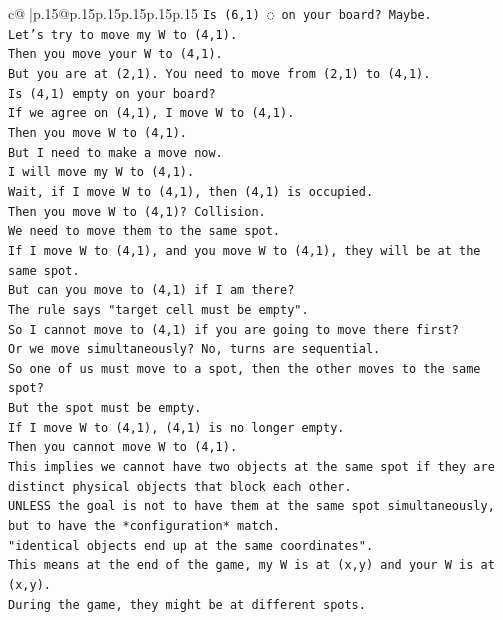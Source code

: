 \documentclass{article}
\begin{document}
{\begin{supertabular}{c@{$\;$}|p{.15\linewidth}@{}p{.15\linewidth}p{.15\linewidth}p{.15\linewidth}p{.15\linewidth}p{.15\linewidth}}
{{{\texttt{Is (6,1) ◌ on your board? Maybe.} \\
\texttt{Let's try to move my W to (4,1).} \\
\texttt{Then you move your W to (4,1).} \\
\texttt{But you are at (2,1). You need to move from (2,1) to (4,1).} \\
\texttt{Is (4,1) empty on your board?} \\
\texttt{If we agree on (4,1), I move W to (4,1).} \\
\texttt{Then you move W to (4,1).} \\
\texttt{But I need to make a move now.} \\
\texttt{I will move my W to (4,1).} \\
\texttt{Wait, if I move W to (4,1), then (4,1) is occupied.} \\
\texttt{Then you move W to (4,1)? Collision.} \\
\texttt{We need to move them to the same spot.} \\
\texttt{If I move W to (4,1), and you move W to (4,1), they will be at the same spot.} \\
\texttt{But can you move to (4,1) if I am there?} \\
\texttt{The rule says "target cell must be empty".} \\
\texttt{So I cannot move to (4,1) if you are going to move there first?} \\
\texttt{Or we move simultaneously? No, turns are sequential.} \\
\texttt{So one of us must move to a spot, then the other moves to the same spot?} \\
\texttt{But the spot must be empty.} \\
\texttt{If I move W to (4,1), (4,1) is no longer empty.} \\
\texttt{Then you cannot move W to (4,1).} \\
\texttt{This implies we cannot have two objects at the same spot if they are distinct physical objects that block each other.} \\
\texttt{UNLESS the goal is not to have them at the same spot simultaneously, but to have the *configuration* match.} \\
\texttt{"identical objects end up at the same coordinates".} \\
\texttt{This means at the end of the game, my W is at (x,y) and your W is at (x,y).} \\
\texttt{During the game, they might be at different spots.} \\
}}}
\end{supertabular}}
\end{document}
